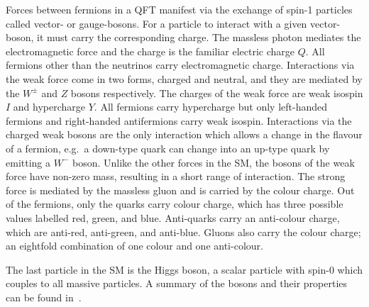 Forces between fermions in a QFT manifest via the exchange of spin-1 particles called vector- or gauge-bosons.
For a particle to interact with a given vector-boson, it must carry the corresponding charge.
The massless photon mediates the electromagnetic force and the charge is the familiar electric charge $Q$.
All fermions other than the neutrinos carry electromagnetic charge.
Interactions via the weak force come in two forms, charged and neutral, and they are mediated by the $W^\pm$ and $Z$ bosons respectively.
The charges of the weak force are weak isospin $I$ and hypercharge $Y$.
All fermions carry hypercharge but only left-handed fermions and right-handed antifermions carry weak isospin.
Interactions via the charged weak bosons are the only interaction which allows a change in the flavour of a fermion, e.g.\ a down-type quark can change into an up-type quark by emitting a $W^-$ boson.
Unlike the other forces in the SM, the bosons of the weak force have non-zero mass, resulting in a short range of interaction.
The strong force is mediated by the massless gluon and is carried by the colour charge.
Out of the fermions, only the quarks carry colour charge, which has three possible values labelled red, green, and blue.
Anti-quarks carry an anti-colour charge, which are anti-red, anti-green, and anti-blue.
Gluons also carry the colour charge; an eightfold combination of one colour and one anti-colour.

The last particle in the SM is the Higgs boson, a scalar particle with spin-0 which couples to all massive particles.
A summary of the bosons and their properties can be found in~.

